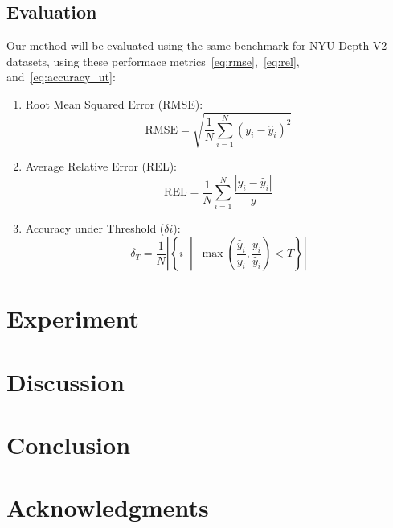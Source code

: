 \documentclass[a4paper,12pt]{article}
\begin{document}
\subsection{Evaluation}
Our method will be evaluated using the same benchmark for NYU Depth V2 datasets, using these performace metrics~\ref{eq:rmse},~\ref{eq:rel}, and~\ref{eq:accuracy_ut}:
\begin{enumerate}
    \item Root Mean Squared Error (RMSE):
    \begin{equation}\label{eq:rmse}
        \mathrm{RMSE} = \sqrt{\frac{1}{N}\sum_{i=1}^{N} \left( y_i - \hat{y}_i \right)^2}
    \end{equation}
    \item Average Relative Error (REL):
    \begin{equation}\label{eq:rel}
        \mathrm{REL} = \frac{1}{N}\sum_{i=1}^{N} \frac{\left| y_i - \hat{y}_i \right|}{y}
    \end{equation}
    \item Accuracy under Threshold ($\delta i$):
    \begin{equation}\label{eq:accuracy_ut}
        \delta_T = \frac{1}{N}
        \left|
        \left\{
        i \;\middle|\;
        \max\left(
        \frac{\hat{y}_i}{y_i},
        \frac{y_i}{\hat{y}_i}
        \right) < T
        \right\}
        \right|
    \end{equation}
\end{enumerate}

\section{Experiment}

\section{Discussion}

\section{Conclusion}

\section{Acknowledgments}



\end{document}
